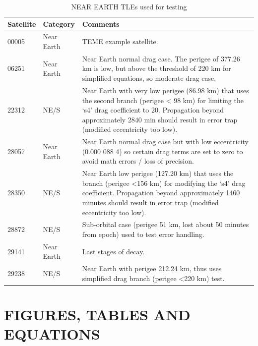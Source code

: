 \documentclass{article}
\begin{document}
\begin{table}[p]
\centering
\caption{NEAR EARTH TLEs used for testing}\vspace{2mm}
\begin{tabular}{|l|l|p{14cm}|}
\hline\hline
Satellite & Category & Comments\\
\hline
00005 & Near Earth & TEME example satellite.\\
06251 &  Near Earth  & Near Earth normal drag case. The perigee of 377.26 km is low, but above the threshold of 220
km for simplified equations, so moderate drag case.\\
22312  & NE/S  & Near Earth with very low perigee (86.98 km) that uses the second branch (perigee < 98 km)
for limiting the ‘s4’ drag coefficient to 20. Propagation beyond approximately 2840 min
should result in error trap (modified eccentricity too low).\\
28057 &  Near Earth  & Near Earth normal drag case but with low eccentricity (0.000 088 4) so certain drag terms are
set to zero to avoid math errors / loss of precision.\\
28350 & NE/S  & Near Earth low perigee (127.20 km) that uses the branch (perigee \textless 156 km) for modifying
the ‘s4’ drag coefficient. Propagation beyond approximately 1460 minutes should result in
error trap (modified eccentricity too low).\\
28872  & NE/S  & Sub-orbital case (perigee 51 km, lost about 50 minutes from epoch) used to test error handling.\\
29141  & Near Earth  & Last stages of decay.\\
29238  & NE/S  & Near Earth with perigee 212.24 km, thus uses simplified drag branch (perigee \textless 220 km) test.\\
\hline\hline
\end{tabular}
\label{tab:res}
\end{table}


\section{FIGURES, TABLES AND EQUATIONS}
\label{sec:floats}


\end{document}
